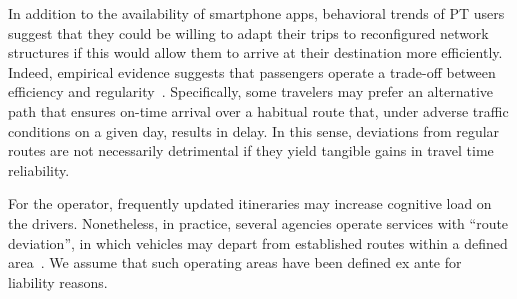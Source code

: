 \documentclass[a4paper,fleqn]{cas-sc}
\begin{document}
In addition to the availability of smartphone apps, behavioral trends of PT users suggest that they could be willing to adapt their trips to reconfigured network structures if this would allow them to arrive at their destination more efficiently.
Indeed, empirical evidence suggests that passengers operate a trade-off between efficiency and regularity~\citep{devarasetty2012value}. Specifically, some travelers may prefer an alternative path that ensures on-time arrival over a habitual route that, under adverse traffic conditions on a given day, results in delay. In this sense, deviations from regular routes are not necessarily detrimental if they yield tangible gains in travel time reliability. 

For the operator, frequently updated itineraries may increase cognitive load on the drivers.
Nonetheless, in practice, several agencies operate services with ``route deviation'', in which vehicles may depart from established routes within a defined area~\citep{NationalRTAP_ADA_Toolkit_2024}.  We assume that such operating areas have been defined ex ante for liability reasons.
\end{document}
